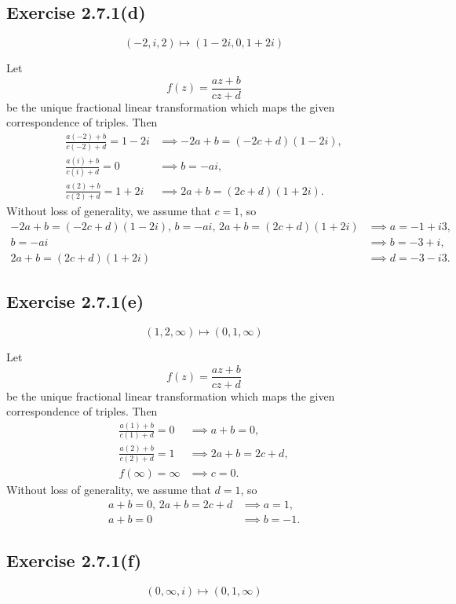 \documentclass[12pt]{article}
\newenvironment{problem}
    {\begin{lrbox}{\mybox}\begin{minipage}{\textwidth-10pt}}
    {\end{minipage}\end{lrbox}\framebox[6.5in]{\usebox{\mybox}}}
\begin{document}
\subsection*{Exercise 2.7.1(d)}
\begin{problem}
    \[(-2, i, 2)\mapsto(1-2i, 0, 1+2i)\]
\end{problem}
\medskip

Let
\[f(z) = \frac{az+b}{cz+d}\]
be the unique fractional linear transformation which maps the given correspondence of triples. Then
\begin{align*}
    \frac{a(-2)+b}{c(-2)+d} = 1-2i &\implies -2a + b = (-2c+d)(1-2i), \\
    \frac{a(i)+b}{c(i)+d} = 0 &\implies b = -ai, \\
    \frac{a(2)+b}{c(2)+d} = 1+2i &\implies 2a + b = (2c+d)(1+2i).
\end{align*}
Without loss of generality, we assume that $c=1$, so
\begin{align*}
    -2a + b = (-2c+d)(1-2i),\, b = -ai,\, 2a + b = (2c+d)(1+2i) &\implies a = -1 + i3, \\
    b = -ai &\implies b = -3 + i, \\
    2a + b = (2c+d)(1+2i) &\implies d=-3-i3.
\end{align*}

\subsection*{Exercise 2.7.1(e)}
\begin{problem}
    \[(1, 2, \infty)\mapsto(0, 1, \infty)\]
\end{problem}
\medskip

Let
\[f(z) = \frac{az+b}{cz+d}\]
be the unique fractional linear transformation which maps the given correspondence of triples. Then
\begin{align*}
    \frac{a(1)+b}{c(1)+d} = 0 &\implies a+b = 0, \\
    \frac{a(2)+b}{c(2)+d} = 1 &\implies 2a+ b = 2c + d, \\
    f(\infty) = \infty &\implies c=0.
\end{align*}
Without loss of generality, we assume that $d=1$, so
\begin{align*}
    a+b = 0,\, 2a+ b = 2c + d  &\implies a= 1, \\
    a+b=0 &\implies b = -1.
\end{align*}

\subsection*{Exercise 2.7.1(f)}
\begin{problem}
    \[(0, \infty, i)\mapsto(0, 1, \infty)\]
\end{problem}
\medskip
\end{document}
